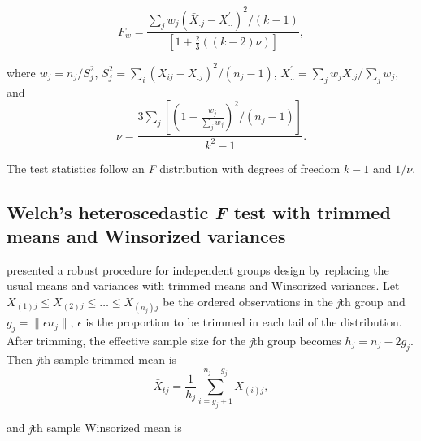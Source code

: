 \begin{equation}\label{welch}	
F_w=\frac{\sum_{j}w_j(\bar{X}_{.j}-X_{..}^{'})^2/(k-1)}{\left[1+\frac{2}{3}((k-2)\nu) \right ]},
\end{equation}

\noindent where $w_j=n_j/S_j^2$, $S_j^2=\sum_{i}(X_{ij}-\bar{X}_{.j})^2/(n_j-1)$,
\begin{math}
X_{..}^{'} ={\sum_{j}w_j\bar{X}_{.j}}/{\sum_{j}w_j},
\end{math}
and
\begin{equation*}
\nu =\frac{3\sum_{j}\left[\left(1-\frac{w_j}{\sum_{j}w_j}\right)^2/(n_{j}-1)\right]}{k^2-1}.
\end{equation*}

\noindent The test statistics follow an \textit{F} distribution with degrees of freedom $k-1$ and $1/ \nu$.

\subsection{Welch's heteroscedastic \textit{F} test with trimmed means and Winsorized variances}
\cite{WELCH:1951} presented a robust procedure for independent groups design by replacing the usual means and variances with trimmed means and Winsorized variances. 
Let $X_{(1)j}\leq X_{(2)j}\leq \ldots  \leq X_{(n_j)j}$ be the ordered observations in the \textit{j}th group and $g_j= \|\epsilon n_j \|$, $\epsilon$ is the proportion to be trimmed in each tail of the distribution. After trimming, the effective sample size for the \textit{j}th group becomes $h_j=n_j-2g_j$. Then \textit{j}th sample trimmed mean is
\begin{equation*}
\bar{X}_{tj}=\frac{1}{h_j}\sum_{i=g_j+1}^{n_j-g_j}X_{(i)j},
\end{equation*}

\noindent and \textit{j}th sample Winsorized mean is

